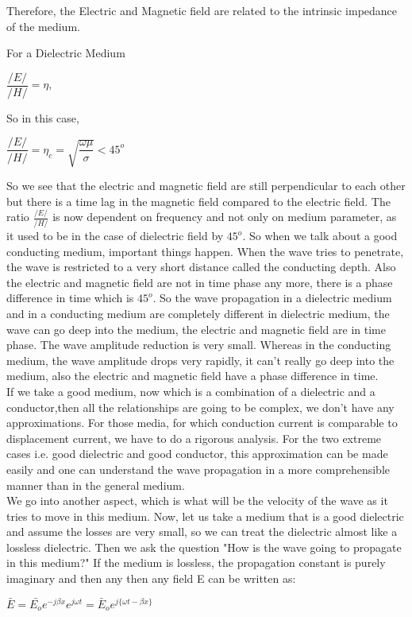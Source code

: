 		Therefore, the Electric and Magnetic field are related to the intrinsic impedance of the medium.\newline
		
		For a Dielectric Medium\newline
		
		\begin{center}
		$\dfrac{/E/}{/H/}=\eta,$\newline
	\end{center}
		
		So in this case, \newline
		
		$\dfrac{/E/}{/H/}=\eta_{c}=\sqrt{\dfrac{\omega\mu}{\sigma}}<45^{o}$
		
		So we see that the electric and magnetic field are still perpendicular to each other but there is a time lag in the magnetic field compared to the electric field. The ratio $\frac{/E/}{/H/}$   is now dependent on frequency and not only on medium parameter, as it used to be in the case of dielectric field by $ 45^{o} $. So when we talk about a good conducting medium, important things happen.\newline
		When the wave tries to penetrate, the wave is restricted to a very short distance called the conducting depth. Also the electric and magnetic field are not in time phase any more, there is a phase difference in time which is $ 45^{o} $.\newline
		So the wave propagation in a dielectric medium and in a conducting medium are completely different in dielectric medium, the wave can go deep into the medium, the electric and magnetic field are in time phase. The wave amplitude reduction is very small. Whereas in the conducting medium, the wave amplitude drops very rapidly, it can't really go deep into the medium, also the electric and magnetic field have a phase difference in time.\\
		
		If we take a good medium, now which is a combination of a dielectric and a conductor,then all the relationships are going to be complex, we don't have any approximations. For those media, for which conduction current is comparable to displacement current, we have to do a rigorous analysis. For the two extreme cases i.e. good dielectric and good conductor, this approximation can be made easily and one can understand the wave propagation in a more comprehensible manner than in the general medium.\\
		We go into another aspect, which is what will be the velocity of the wave as it tries to move in this medium. Now, let us take a medium that is a good dielectric and assume the losses are very small, so we can treat the dielectric almost like a lossless dielectric. Then we ask the question "How is the wave going to propagate in this medium?" If the medium is lossless, the propagation constant is purely imaginary and then any then any field E can be written as:\\ \begin{center}$\bar{E}=\bar{E_{o}}e^{-j\beta x}e^{j\omega t}=\bar{E}_{o}e^{j\{\omega t-\beta x\}} $
		\end{center}
		
